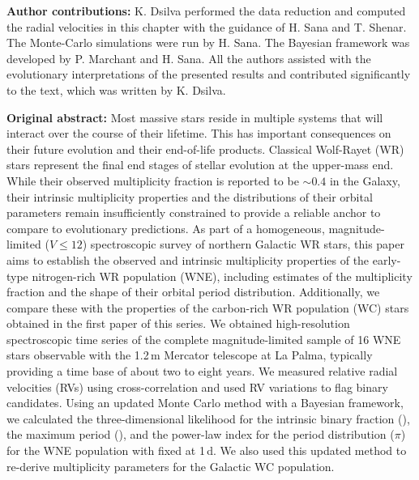 \textbf{Author contributions:} K. Dsilva performed the data reduction and computed the radial velocities in this chapter with the guidance of H. Sana and T. Shenar. The Monte-Carlo simulations were run by H. Sana. The Bayesian framework was developed by P. Marchant and H. Sana. All the authors assisted with the evolutionary interpretations of the presented results and contributed significantly to the text, which was written by K. Dsilva.
\newpage
\begin{abs}
\vspace{3mm}
\textbf{Original abstract:}
\newline \newline
Most massive stars reside in multiple systems that will interact over the course of their lifetime. This has important consequences on their future evolution and their end-of-life products. Classical Wolf-Rayet (WR) stars represent the final end stages of stellar evolution at the upper-mass end. While their observed multiplicity fraction is reported to be ${\sim}0.4$ in the Galaxy, their intrinsic multiplicity properties and the distributions of their orbital parameters remain insufficiently constrained to provide a reliable anchor to compare to evolutionary predictions.
  \newline \newline%
As part of a homogeneous, magnitude-limited ($V\leq12$) spectroscopic survey of northern Galactic WR stars, this paper aims to establish the observed and intrinsic multiplicity properties of the early-type nitrogen-rich WR population (WNE), including estimates of the multiplicity fraction and the shape of their orbital period distribution. Additionally, we compare these with the properties of the carbon-rich WR population (WC) stars obtained in the first paper of this series.
 \newline \newline%
We obtained high-resolution spectroscopic time series of the complete magnitude-limited sample of 16 WNE stars observable with the 1.2\,m Mercator telescope at La Palma, typically providing a time base of about two to eight years. We measured relative radial velocities (RVs) using cross-correlation and used RV variations to flag binary candidates. Using an updated Monte Carlo method with a Bayesian framework, we calculated the three-dimensional likelihood for the intrinsic binary fraction (\fintWNE{}), the maximum period (\logPmax{}), and the power-law index for the period distribution ($\pi$) for the WNE population with \Pmin{} fixed at 1\,d. We also used this updated method to re-derive multiplicity parameters for the Galactic WC population.


\end{abs}
